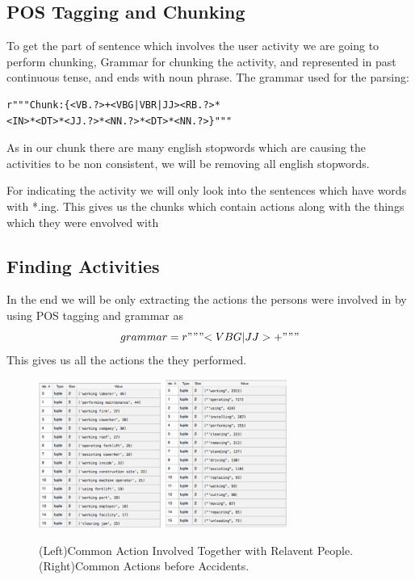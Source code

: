 \documentclass[DIV=calc, paper=a4, fontsize=11pt, twocolumn]{scrartcl}	 %
\begin{document}
\subsection{POS Tagging and Chunking}

To get the part of sentence which involves the user activity we are
going to perform chunking, Grammar for chunking the activity, and
represented in past continuous tense, and ends with noun phrase.
The grammar used for the parsing:

\begin{verbatim}
r"""Chunk:{<VB.?>+<VBG|VBR|JJ><RB.?>*
<IN>*<DT>*<JJ.?>*<NN.?>*<DT>*<NN.?>}"""
\end{verbatim}

As in our chunk there are many english stopwords which are causing the activities to be non consistent, we will be removing all english stopwords.


For indicating the activity we will only look into the sentences which have words with *.ing. This
gives us the chunks which contain actions along with the things which they were envolved with

\subsection{Finding Activities}
In the end we will be only extracting the actions the persons were involved in by using
POS tagging and grammar as
$$grammar = r"""{<VBG|JJ>+}"""$$
This gives us all the actions the they performed.


\begin{figure}%
    \centering
    \includegraphics[width=4cm]{q41.png}
    \includegraphics[width=4cm]{q42.png}
    \caption{(Left)Common Action Involved Together with Relavent
      People. (Right)Common Actions before Accidents.}%
\end{figure}
\end{document}
